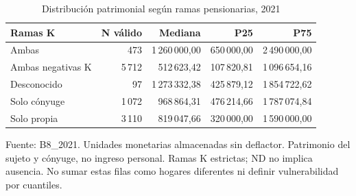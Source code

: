 \begin{table}[!htbp]
\centering
\caption{Distribución patrimonial según ramas pensionarias, 2021}\label{tab:exploracion-patrimonio}
\small\setlength{\tabcolsep}{4pt}
\renewcommand{\arraystretch}{1.15}
\begin{tabular}{lrrrr}
\toprule
\textbf{Ramas K} & \textbf{N válido} & \textbf{Mediana} & \textbf{P25} & \textbf{P75} \\
\midrule
Ambas & 473 & 1\,260\,000,00 & 650\,000,00 & 2\,490\,000,00 \\
Ambas negativas K & 5\,712 & 512\,623,42 & 107\,820,81 & 1\,096\,654,16 \\
Desconocido & 97 & 1\,273\,332,38 & 425\,879,12 & 1\,854\,722,62 \\
Solo cónyuge & 1\,072 & 968\,864,31 & 476\,214,66 & 1\,787\,074,84 \\
Solo propia & 3\,110 & 819\,047,66 & 320\,000,00 & 1\,590\,000,00 \\
\bottomrule
\end{tabular}
\par\medskip
\parbox{\linewidth}{\footnotesize Fuente: B8\_2021. Unidades monetarias almacenadas sin deflactor. Patrimonio del sujeto y cónyuge, no ingreso personal. Ramas K estrictas; ND no implica ausencia. No sumar estas filas como hogares diferentes ni definir vulnerabilidad por cuantiles.}
\end{table}
